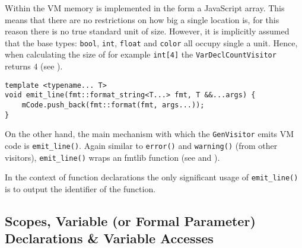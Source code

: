 \begin{note}\label{sss:framesizecalc}
Within the VM memory is implemented in the form a JavaScript
array. This means that there are no restrictions on how big a
single location is, for this reason there is no true standard
unit of size. However, it is implicitly assumed that the base
types: \texttt{bool}, \texttt{int}, \texttt{float} and
\texttt{color} all occupy single a unit. Hence, when calculating
the size of for example \texttt{int[4]} the
\texttt{VarDeclCountVisitor} returns $4$ (see
).
\end{note}

\begin{lstlisting}[caption={The \texttt{emit\_line()} method in
the \texttt{GenVisitor} class (ir\_gen/GenVisitor.cpp).},
label=lst:emitline]
template <typename... T>
void emit_line(fmt::format_string<T...> fmt, T &&...args) {
    mCode.push_back(fmt::format(fmt, args...));
}
\end{lstlisting}

On the other hand, the main mechanism with which the
\texttt{GenVisitor} emits VM code is \texttt{emit\_line()}.
Again similar to \texttt{error()} and \texttt{warning()} (from
other visitors), \texttt{emit\_line()} wraps an fmtlib function
(see  and ).

In the context of function declarations the only significant
usage of \texttt{emit\_line()} is to output the identifier of
the function.

\subsection{Scopes, Variable (or Formal Parameter) Declarations
\& Variable Accesses}

